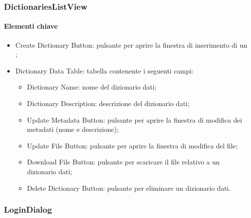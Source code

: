 \subsubsection{DictionariesListView}

\paragraph*{Elementi chiave}
\begin{itemize}
  \item Create Dictionary Button: pulsante per aprire la finestra di inserimento di un ;
  \item Dictionary Data Table: tabella contenente i seguenti campi:
  \begin{itemize}
    \item Dictionary Name: nome del dizionario dati;
    \item Dictionary Description: descrizione del dizionario dati;
    \item Update Metadata Button: pulsante per aprire la finestra di modifica dei metadati (nome e descrizione);
    \item Update File Button: pulsante per aprire la finestra di modifica del file;
    \item Download File Button: pulsante per scaricare il file relativo a un dizionario dati;
    \item Delete Dictionary Button: pulsante per eliminare un dizionario dati.
  \end{itemize}
\end{itemize}

\subsubsection{LoginDialog}

